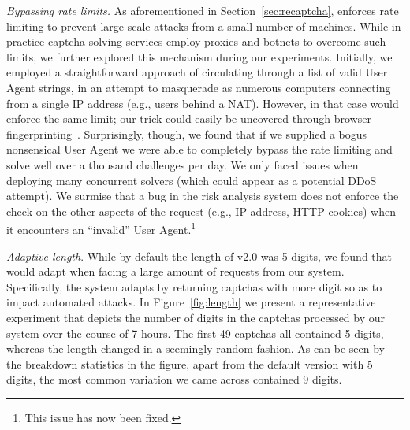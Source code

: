 \emph{Bypassing rate limits.} As aforementioned in Section~\ref{sec:recaptcha}, \re enforces 
rate limiting to prevent large scale attacks from a small number of machines. While in practice
captcha solving services employ proxies and botnets
to overcome such limits, we further explored this mechanism during our experiments. Initially,
we employed a straightforward approach of circulating through a list of valid User Agent strings,
in an attempt to masquerade as numerous computers connecting from a single IP address (e.g., users behind a NAT).
However, in that case \re would enforce the same limit; our trick could easily be uncovered
through browser fingerprinting~\cite{laperdrix2016beauty}. Surprisingly, though, we found that if we 
supplied a bogus nonsensical User Agent we were able to completely bypass the rate limiting
and solve well over a thousand challenges per day.
We only faced issues when deploying many concurrent solvers (which could appear as a potential DDoS attempt).
We surmise that a bug in the risk analysis
system does not enforce the check on the other aspects of the request (e.g., IP address, HTTP cookies) when
it encounters an ``invalid'' User Agent.\footnote{This issue has now been fixed.}

\emph{Adaptive length}.
While by default the length of \re v2.0 was 5 digits, we found %
that \re would adapt when facing a large amount of requests from our system.
Specifically, the system adapts by returning captchas with more digit so as to impact automated attacks.
In Figure~\ref{fig:length} we present a representative experiment that depicts the number of digits in the captchas
processed by our system over the course of 7 hours. The first 49 captchas all contained 5 digits, whereas the length
changed in a seemingly random fashion. As can be seen by the breakdown statistics in the figure, apart from the default
version with 5 digits, the most common variation we came across contained 9 digits. 

